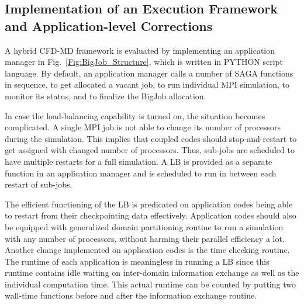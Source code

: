 \documentclass[preprint,12pt]{elsarticle}
\begin{document}



\subsection{Implementation of an Execution Framework and Application-level Corrections}
A hybrid CFD-MD framework is evaluated by implementing an application manager in Fig.~\ref{Fig:BigJob_Structure}, which is written in PYTHON script language. By default, an application manager calls a number of SAGA functions in sequence, to get allocated a vacant job, to run individual MPI simulation, to monitor its status, and to finalize the BigJob allocation.

In case the load-balancing capability is turned on, the situation becomes complicated. A single MPI job is not able to change its number of processors during the simulation. This implies that coupled codes should stop-and-restart to get assigned with changed number of processors. Thus, sub-jobs are scheduled to have multiple restarts for a full simulation. A LB is provided as a separate function in an application manager and is scheduled to run in between each restart of sub-jobs.

The efficient functioning of the LB is predicated on application codes being able to restart from their checkpointing data effectively. Application codes should also be equipped with generalized domain partitioning routine to run a simulation with any number of processors, without harming their parallel efficiency a lot. 
Another change implemented on application codes is the time checking routine. The runtime of each application is meaningless in running a LB since this runtime contains idle waiting on inter-domain information exchange as well as the individual computation time. This actual runtime can be counted by putting two wall-time functions before and after the information exchange routine.
\end{document}
